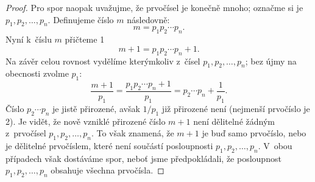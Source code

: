 \begin{proof}
    Pro spor naopak uvažujme, že prvočísel je konečně mnoho; označme si je $p_1, p_2, \dots, p_n$. Definujeme číslo $m$ následovně:
    \begin{equation*}
        m=p_1p_2\cdots p_n.
    \end{equation*}
    Nyní k~číslu $m$ přičteme 1
    \begin{equation*}
        m+1=p_1p_2\cdots p_n+1.
    \end{equation*}
    Na závěr celou rovnost vydělíme kterýmkoliv z~čísel $p_1, p_2, \dots, p_n$; bez újmy na obecnosti zvolme $p_1$:
    \begin{equation*}
        \dfrac{m+1}{p_1}=\dfrac{p_1p_2\cdots p_n+1}{p_1}=p_2\cdots p_n+\dfrac{1}{p_1}.
    \end{equation*}
    Číslo $p_2\cdots p_n$ je jistě přirozené, avšak $1/p_1$ již přirozené není (nejmenší prvočíslo je 2). Je vidět, že nově vzniklé přirozené číslo $m+1$ není dělitelné žádným z~prvočísel $p_1, p_2, \dots, p_n$. To však znamená, že $m+1$ je buď samo prvočíslo, nebo je dělitelné prvočíslem, které není součástí posloupnosti $p_1, p_2, \dots, p_n$. V~obou případech však dostáváme spor, neboť jsme předpokládali, že posloupnost $p_1, p_2, \dots, p_n$ obsahuje všechna prvočísla.
\end{proof}

